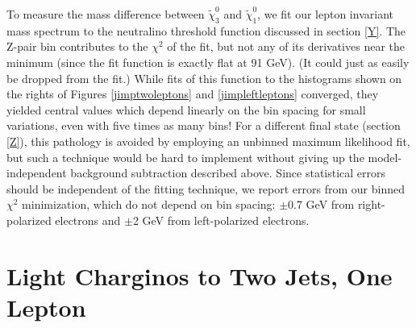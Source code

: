 \documentclass[12pt]{article}
\begin{document}
To measure the mass difference between $\tilde{\chi}^0_3$ and
$\tilde{\chi}^0_1$, we fit our lepton invariant mass spectrum to the
neutralino threshold function discussed in section \ref{Y}.  The
Z-pair bin contributes to the $\chi^2$ of the fit, but not any of its
derivatives near the minimum (since the fit function is exactly flat
at 91 GeV).  (It could just as easily be dropped from the fit.)  While
fits of this function to the histograms shown on the rights of Figures
\ref{jimptwoleptons} and \ref{jimpleftleptons} converged, they yielded
central values which depend linearly on the bin spacing for small
variations, even with five times as many bins!  For a different final
state (section \ref{Z}), this pathology is avoided by employing an
unbinned maximum likelihood fit, but such a technique would be hard to
implement without giving up the model-independent background
subtraction described above.  Since statistical errors should be
independent of the fitting technique, we report errors from our binned
$\chi^2$ minimization, which do not depend on bin spacing: $\pm$0.7
GeV from right-polarized electrons and $\pm$2 GeV from left-polarized
electrons.

\section{Light Charginos to Two Jets, One Lepton}
\end{document}
